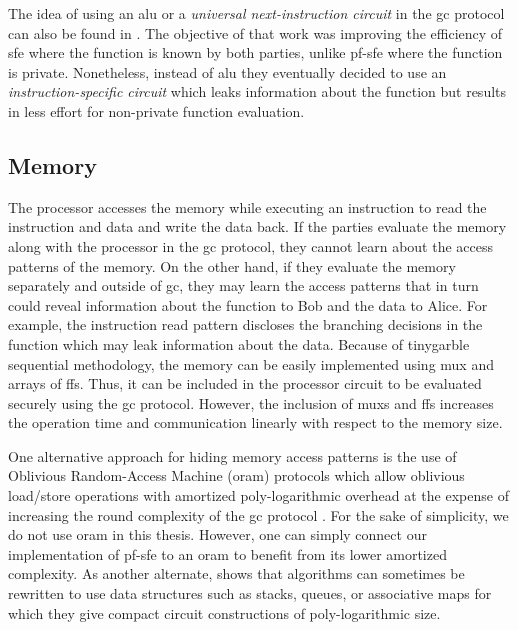 The idea of using an \acrshort{alu} or a \emph{universal next-instruction circuit} in the \acrshort{gc} protocol can also be found in \cite{liu2014automating}.
The objective of that work was improving the efficiency of \acrshort{sfe} where the function is known by both parties, unlike \acrshort{pf-sfe} where the function is private.
Nonetheless, instead of \acrshort{alu} they eventually decided to use an \emph{instruction-specific circuit} which leaks information about the function but results in less effort for non-private function evaluation.

\subsection{Memory}\label{ssec:processor-mem}
The processor accesses the memory while executing an instruction to read the instruction and data and write the data back.
If the parties evaluate the memory along with the processor in the \acrshort{gc} protocol, they cannot learn about the access patterns of the memory.
On the other hand, if they evaluate the memory separately and outside of \acrshort{gc}, they may learn the access patterns that in turn could reveal information about the function to Bob and the data to Alice.
For example, the instruction read pattern discloses the branching decisions in the function which may leak information about the data.
Because of \gls{tinygarble} sequential methodology, the memory can be easily implemented using \acrshort{mux} and arrays of \acrshort{ff}s.
Thus, it can be included in the processor circuit to be evaluated securely using the \acrshort{gc} protocol.
However, the inclusion of \acrshort{mux}s and \acrshort{ff}s increases the operation time and communication linearly with respect to the memory size.

One alternative approach for hiding memory access patterns is the use of Oblivious Random-Access Machine (\acrshort{oram}) protocols \cite{goldreich1996software} which allow oblivious load/store operations with amortized poly-logarithmic overhead at the expense of increasing the round complexity of the \acrshort{gc} protocol \cite{gordon2012secure,liu2014automating,lu2013garble,gentry2014garbled}.
For the sake of simplicity, we do not use \acrshort{oram} in this thesis.
However, one can simply connect our implementation of \acrshort{pf-sfe} to an \acrshort{oram} to benefit from its lower amortized complexity.
As another alternate, \cite{zahur2013circuit} shows that algorithms can sometimes be rewritten to use data structures such as stacks, queues, or associative maps for which they give compact circuit constructions of poly-logarithmic size.

